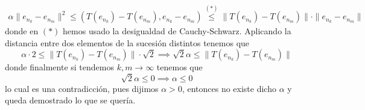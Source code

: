 \begin{ejercicio}
    \begin{align*}
        \alpha \|e_{n_k} - e_{n_m}\|^2\leq (T(e_{n_k}) - T(e_{n_m}), e_{n_k} - e_{n_m} ) \overset{(*)}{\leq} \|T(e_{n_k}) - T(e_{n_m})\| \cdot \|e_{n_k} - e_{n_m}\|
    \end{align*}
    donde en $(*)$ hemos usado la desigualdad de Cauchy-Schwarz. Aplicando la distancia entre dos elementos de la sucesión distintos tenemos que
    $$\alpha \cdot 2 \leq \|T(e_{n_k}) - T(e_{n_m})\| \cdot \sqrt{2}\implies \sqrt{2} \alpha \leq \|T(e_{n_k}) - T(e_{n_m})\|$$
    donde finalmente si tendemos $k,m\to \infty$ tenemos que
    $$\sqrt{2} \alpha \leq 0 \implies \alpha \leq 0$$
    lo cual es una contradicción, pues dijimos $\alpha>0$, entonces no existe dicho $\alpha$ y queda demostrado lo que se quería.
\end{ejercicio}

